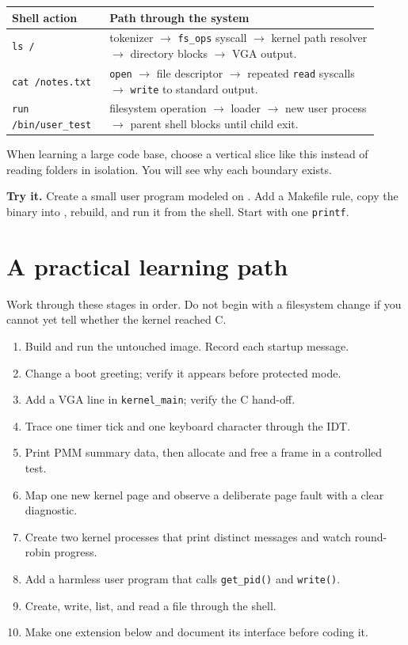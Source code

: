 \documentclass[11pt,oneside]{book}
\newcommand{\pathname}[1]{\texttt{\detokenize{#1}}}
\newcommand{\exercise}[1]{\medskip\noindent\textbf{Try it.} #1\medskip}
\begin{document}
\begin{longtable}{p{0.24\linewidth}p{0.68\linewidth}}
\textbf{Shell action} & \textbf{Path through the system}\\ \hline
\texttt{ls /} & tokenizer $\rightarrow$ \texttt{fs\_ops} syscall $\rightarrow$ kernel path resolver $\rightarrow$ directory blocks $\rightarrow$ VGA output.\\
\texttt{cat /notes.txt} & \texttt{open} $\rightarrow$ file descriptor $\rightarrow$ repeated \texttt{read} syscalls $\rightarrow$ \texttt{write} to standard output.\\
\texttt{run /bin/user\_test} & filesystem operation $\rightarrow$ loader $\rightarrow$ new user process $\rightarrow$ parent shell blocks until child exit.\\
\end{longtable}

When learning a large code base, choose a vertical slice like this instead of reading folders in isolation. You will see why each boundary exists.

\exercise{Create a small user program modeled on \pathname{user/programs/test.c}. Add a Makefile rule, copy the binary into \pathname{rootfs/bin/}, rebuild, and run it from the shell. Start with one \texttt{printf}.}



\chapter{A practical learning path}
Work through these stages in order. Do not begin with a filesystem change if you cannot yet tell whether the kernel reached C.

\begin{enumerate}
\item Build and run the untouched image. Record each startup message.
\item Change a boot greeting; verify it appears before protected mode.
\item Add a VGA line in \texttt{kernel\_main}; verify the C hand-off.
\item Trace one timer tick and one keyboard character through the IDT.
\item Print PMM summary data, then allocate and free a frame in a controlled test.
\item Map one new kernel page and observe a deliberate page fault with a clear diagnostic.
\item Create two kernel processes that print distinct messages and watch round-robin progress.
\item Add a harmless user program that calls \texttt{get\_pid()} and \texttt{write()}.
\item Create, write, list, and read a file through the shell.
\item Make one extension below and document its interface before coding it.
\end{enumerate}
\end{document}
